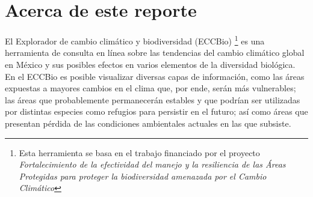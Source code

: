 \documentclass{article}
\begin{document}
	
	\tableofcontents
	\section*{Acerca de este reporte}
	El Explorador de cambio clim\'atico y biodiversidad (ECCBio) \footnote{Esta herramienta se basa en el trabajo financiado por el proyecto \emph{Fortalecimiento de la efectividad del manejo y la resiliencia de las \'Areas Protegidas para proteger la biodiversidad amenazada por el Cambio Clim\'atico}} es una herramienta de consulta en l\'inea sobre las tendencias del cambio clim\'atico global en M\'exico y sus posibles efectos en varios elementos de la diversidad biol\'ogica. En el ECCBio es posible visualizar diversas capas de informaci\'on, como las \'areas expuestas a mayores cambios en el clima que, por ende, ser\'an m\'as vulnerables; las \'areas que probablemente permanecer\'an estables y que podr\'ian ser utilizadas por distintas especies como refugios para persistir en el futuro; as\'i como \'areas que presentan p\'erdida de las condiciones ambientales actuales en las que subsiste.
	\newpage








\end{document}
